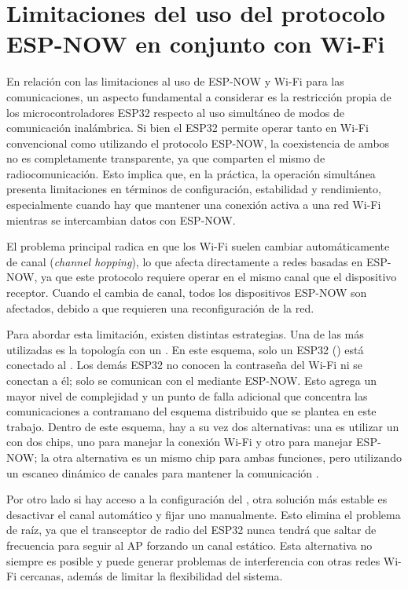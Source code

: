 \section{Limitaciones del uso del protocolo ESP-NOW en conjunto con Wi-Fi}

En relación con las limitaciones al uso de ESP-NOW y Wi-Fi para las comunicaciones, un aspecto fundamental a considerar es la restricción propia de los microcontroladores ESP32 respecto al uso simultáneo de modos de comunicación inalámbrica. Si bien el ESP32 permite operar tanto en Wi-Fi convencional como utilizando el protocolo ESP-NOW, la coexistencia de ambos no es completamente transparente, ya que comparten el mismo  de radiocomunicación. Esto implica que, en la práctica, la operación simultánea presenta limitaciones en términos de configuración, estabilidad y rendimiento, especialmente cuando hay que mantener una conexión activa a una red Wi-Fi mientras se intercambian datos con ESP-NOW.

El problema principal radica en que los  Wi-Fi suelen cambiar automáticamente de canal (\textit{channel hopping}), lo que afecta directamente a redes basadas en ESP-NOW, ya que este protocolo requiere operar en el mismo canal que el dispositivo receptor. Cuando el  cambia de canal, todos los dispositivos ESP-NOW son afectados, debido a que requieren una reconfiguración de la red.

Para abordar esta limitación, existen distintas estrategias. Una de las más utilizadas es la topología con un . En este esquema, solo un ESP32 () está conectado al . Los demás ESP32 no conocen la contraseña del Wi-Fi ni se conectan a él; solo se comunican con el  mediante ESP-NOW. Esto agrega un mayor nivel de complejidad y un punto de falla adicional que concentra las comunicaciones a contramano del esquema distribuido que se plantea en este trabajo. Dentro de este esquema, hay a su vez dos alternativas: una es utilizar un  con dos chips, uno para manejar la conexión Wi-Fi y otro para manejar ESP-NOW; la otra alternativa es un mismo chip para ambas funciones, pero utilizando un escaneo dinámico de canales para mantener la comunicación \cite{eichhorn2025_espnow_wifi}.

Por otro lado si hay acceso a la configuración del , otra solución más estable es desactivar el canal automático y fijar uno manualmente. Esto elimina el problema de raíz, ya que el transceptor de radio del ESP32 nunca tendrá que saltar de frecuencia para seguir al AP forzando un canal estático. Esta alternativa no siempre es posible y puede generar problemas de interferencia con otras redes Wi-Fi cercanas, además de limitar la flexibilidad del sistema.

